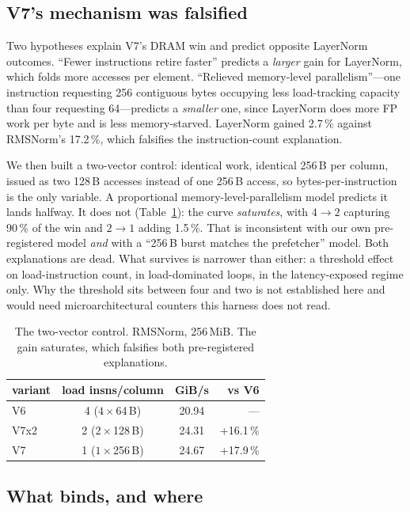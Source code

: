 \documentclass[conference,10pt]{IEEEtran}
\begin{document}
\subsection{V7's mechanism was falsified}

Two hypotheses explain V7's DRAM win and predict opposite LayerNorm outcomes.
``Fewer instructions retire faster'' predicts a \emph{larger} gain for
LayerNorm, which folds more accesses per element. ``Relieved memory-level
parallelism''---one instruction requesting 256 contiguous bytes occupying less
load-tracking capacity than four requesting 64---predicts a \emph{smaller} one,
since LayerNorm does more FP work per byte and is less memory-starved.
LayerNorm gained 2.7\,\% against RMSNorm's 17.2\,\%, which falsifies the
instruction-count explanation.

We then built a two-vector control: identical work, identical 256\,B per column,
issued as two 128\,B accesses instead of one 256\,B access, so
bytes-per-instruction is the only variable. A proportional
memory-level-parallelism model predicts it lands halfway. It does not
(Table~\ref{tab:v7x2}): the curve \emph{saturates}, with $4\!\to\!2$ capturing
90\,\% of the win and $2\!\to\!1$ adding 1.5\,\%. That is inconsistent with our
own pre-registered model \emph{and} with a ``256\,B burst matches the
prefetcher'' model. Both explanations are dead. What survives is narrower than
either: a threshold effect on load-instruction count, in load-dominated loops,
in the latency-exposed regime only. Why the threshold sits between four and two
is not established here and would need microarchitectural counters this harness
does not read.

\begin{table}[t]
\caption{The two-vector control. RMSNorm, 256\,MiB. The gain saturates, which
falsifies both pre-registered explanations.}
\label{tab:v7x2}
\centering
\begin{tabular}{lccr}
\toprule
variant & load insns/column & GiB/s & vs V6 \\
\midrule
V6   & 4 ($4\times$64\,B)  & 20.94 & --- \\
V7x2 & 2 ($2\times$128\,B) & 24.31 & +16.1\,\% \\
V7   & 1 ($1\times$256\,B) & 24.67 & +17.9\,\% \\
\bottomrule
\end{tabular}
\end{table}

\subsection{What binds, and where}
\end{document}
